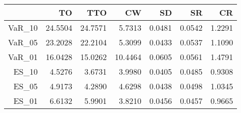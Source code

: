 \begin{tabular}{rrrrrrr}
  \toprule
 & TO & TTO & CW & SD & SR & CR \\ 
  \midrule
VaR\_10 & 24.5504 & 24.7571 & 5.7313 & 0.0481 & 0.0542 & 1.2291 \\ 
  VaR\_05 & 23.2028 & 22.2104 & 5.3099 & 0.0433 & 0.0537 & 1.1090 \\ 
  VaR\_01 & 16.0428 & 15.0262 & 10.4464 & 0.0605 & 0.0561 & 1.4791 \\ 
  ES\_10 & 4.5276 & 3.6731 & 3.9980 & 0.0405 & 0.0485 & 0.9308 \\ 
  ES\_05 & 4.9173 & 4.2890 & 4.6298 & 0.0438 & 0.0498 & 1.0345 \\ 
  ES\_01 & 6.6132 & 5.9901 & 3.8210 & 0.0456 & 0.0457 & 0.9665 \\ 
   \bottomrule
\end{tabular}
